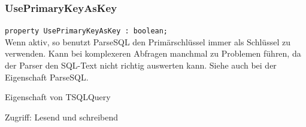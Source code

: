 \subsubsection{UsePrimaryKeyAsKey}
\begin{description}
  \item \texttt{property UsePrimaryKeyAsKey : boolean;}\\Wenn aktiv, so benutzt ParseSQL den Primärschlüssel immer als Schlüssel zu verwenden. Kann bei komplexeren Abfragen manchmal zu Problemen führen, da der Parser den SQL-Text nicht richtig auswerten kann. Siehe auch bei der Eigenschaft ParseSQL.
  \begin{description}
    \item Eigenschaft von TSQLQuery
  \end{description}
  \begin{description}
    \item Zugriff: Lesend und schreibend
  \end{description}
\end{description}

